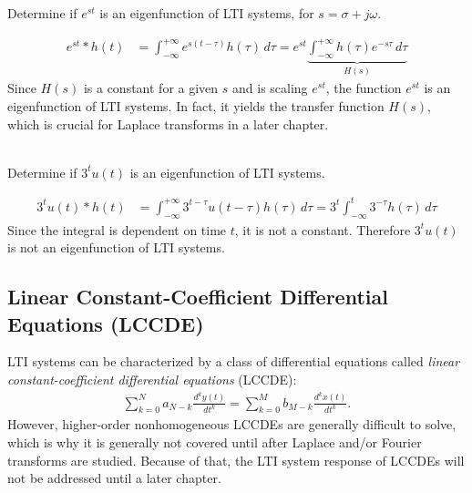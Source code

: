 \documentclass{report}
\begin{document}
\begin{example}
    Determine if $e^{st}$ is an eigenfunction of LTI systems, for $s=\sigma + j\omega$.
\end{example}
\begin{solution}
    \begin{align*}
        e^{st} * h(t) &= \int_{-\infty}^{+\infty} e^{s(t-\tau)}h(\tau) \,d\tau = e^{st} \underbrace{\int_{-\infty}^{+\infty} h(\tau)e^{-s\tau} \,d\tau}_\textrm{$H(s)$}
    \end{align*}
    Since $H(s)$ is a constant for a given $s$ and is scaling $e^{st}$, the function $e^{st}$ is an eigenfunction of LTI systems. 
    In fact, it yields the transfer function $H(s)$, which is crucial for Laplace transforms in a later chapter.
    \\ \\ 
    \begin{center}
    \end{center}
\end{solution}

\begin{example}
    Determine if $3^t u(t)$ is an eigenfunction of LTI systems.
\end{example}
\begin{solution}
    \begin{align*}
        3^t u(t) * h(t) &= \int_{-\infty}^{+\infty} 3^{t-\tau}u(t-\tau)h(\tau) \,d\tau = 3^t \int_{-\infty}^{t} 3^{-\tau}h(\tau) \,d\tau
    \end{align*}
    Since the integral is dependent on time $t$, it is not a constant. Therefore $3^t u(t)$ is not an eigenfunction of LTI systems.
\end{solution}

\subsection{Linear Constant-Coefficient Differential Equations (LCCDE)}
LTI systems can be characterized by a class of differential equations called 
\emph{linear constant-coefficient differential equations} (LCCDE):
\begin{align}
    \sum_{k=0}^{N} a_{N-k} \frac{d^k y(t)}{dt^k} = \sum_{k=0}^{M} b_{M-k} \frac{d^k x(t)}{dt^k}.
\end{align}
However, higher-order nonhomogeneous LCCDEs are generally difficult to solve, which is why it is generally not covered until after Laplace and/or Fourier transforms are studied. 
Because of that, the LTI system response of LCCDEs will not be addressed until a later chapter.
\end{document}
